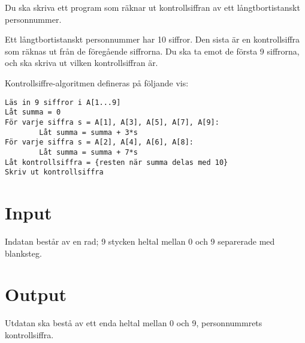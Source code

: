 
Du ska skriva ett program som räknar ut kontrollsiffran av ett långtbortistanskt personnummer.

Ett långtbortistanskt personnummer har 10 siffror. Den sista är en kontrollsiffra som räknas ut från de föregående siffrorna. Du ska ta emot de första 9 siffrorna, och ska skriva ut vilken kontrollsiffran är.

Kontrollsiffre-algoritmen defineras på följande vis:

\begin{verbatim}
Läs in 9 siffror i A[1...9]
Låt summa = 0
För varje siffra s = A[1], A[3], A[5], A[7], A[9]:
        Låt summa = summa + 3*s
För varje siffra s = A[2], A[4], A[6], A[8]:
        Låt summa = summa + 7*s
Låt kontrollsiffra = {resten när summa delas med 10}
Skriv ut kontrollsiffra
\end{verbatim}

\section*{Input}
Indatan består av en rad; 9 stycken heltal mellan 0 och 9 separerade med blanksteg.

\section*{Output}
Utdatan ska bestå av ett enda heltal mellan 0 och 9, personnummrets kontrollsiffra.
